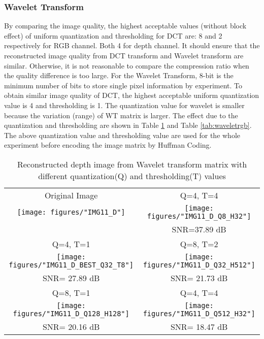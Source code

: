 \subsubsection{Wavelet Transform}
By comparing the image quality, the highest acceptable values (without block effect) 
of uniform quantization and thresholding for DCT are: 8 and 2 respectively for RGB channel. Both 4 for depth channel.
It should ensure that the reconstructed image quality from DCT 
transform and Wavelet transform are similar. Otherwise, it is not reasonable to 
compare the compression ratio when the quality difference is too large.
For the Wavelet Transform, 8-bit is the minimum number of bits to store single 
pixel information by experiment. To obtain similar image quality of DCT, the highest 
acceptable uniform quantization value is 4 and thresholding is 1.
The quantization value for wavelet is smaller because the variation (range) of WT matrix is larger.
The effect due to the quantization and thresholding are shown in Table \ref{tab:waveletdepth} and Table \ref{tab:waveletrgb}. 
The above quantization value and thresholding value are used for the whole experiment before encoding the image matrix by Huffman Coding.

\begin{table}
\center
\begin{tabular}{cc}
Original Image & Q=4, T=4 \\
\texttt{[image: figures/"IMG11\_D"]} &
\texttt{[image: figures/"IMG11\_D\_Q8\_H32"]} \\
& SNR=37.89 dB	\\
Q=4, T=1 & Q=8, T=2 \\
\texttt{[image: figures/"IMG11\_D\_BEST\_Q32\_T8"]} &
\texttt{[image: figures/"IMG11\_D\_Q32\_H512"]} \\
SNR= 27.89 dB & SNR= 21.73 dB	\\
Q=8, T=1 & Q=4, T=4 \\
\texttt{[image: figures/"IMG11\_D\_Q128\_H128"]} &
\texttt{[image: figures/"IMG11\_D\_Q512\_H32"]} \\
SNR= 20.16 dB & SNR= 18.47 dB \\\hline
\end{tabular}
\caption{Reconstructed depth image from Wavelet transform matrix with different quantization(Q) and thresholding(T) values}
\label{tab:waveletdepth}
\end{table}


